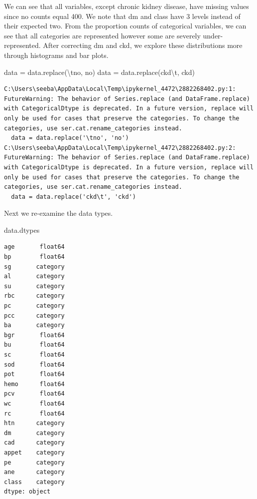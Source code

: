 \documentclass[
  11pt,
  letterpaper,
  DIV=11,
  numbers=noendperiod]{scrartcl}
\newenvironment{Shaded}{\begin{snugshade}}{\end{snugshade}}
\newcommand{\CharTok}[1]{\textcolor[rgb]{0.13,0.47,0.30}{#1}}
\newcommand{\NormalTok}[1]{\textcolor[rgb]{0.00,0.23,0.31}{#1}}
\newcommand{\OperatorTok}[1]{\textcolor[rgb]{0.37,0.37,0.37}{#1}}
\newcommand{\StringTok}[1]{\textcolor[rgb]{0.13,0.47,0.30}{#1}}
\begin{document}
We can see that all variables, except chronic kidney disease, have
missing values since no counts equal 400. We note that dm and class have
3 levels instead of their expected two. From the proportion counts of
categorical variables, we can see that all categories are represented
however some are severely under-represented. After correcting dm and
ckd, we explore these distributions more through histograms and bar
plots.

\begin{Shaded}
\begin{Highlighting}[]
\NormalTok{data }\OperatorTok{=}\NormalTok{ data.replace(}\StringTok{\textquotesingle{}}\CharTok{\textbackslash{}t}\StringTok{no\textquotesingle{}}\NormalTok{, }\StringTok{\textquotesingle{}no\textquotesingle{}}\NormalTok{)}
\NormalTok{data }\OperatorTok{=}\NormalTok{ data.replace(}\StringTok{\textquotesingle{}ckd}\CharTok{\textbackslash{}t}\StringTok{\textquotesingle{}}\NormalTok{, }\StringTok{\textquotesingle{}ckd\textquotesingle{}}\NormalTok{)}
\end{Highlighting}
\end{Shaded}

\begin{verbatim}
C:\Users\seeba\AppData\Local\Temp\ipykernel_4472\2882268402.py:1: FutureWarning: The behavior of Series.replace (and DataFrame.replace) with CategoricalDtype is deprecated. In a future version, replace will only be used for cases that preserve the categories. To change the categories, use ser.cat.rename_categories instead.
  data = data.replace('\tno', 'no')
C:\Users\seeba\AppData\Local\Temp\ipykernel_4472\2882268402.py:2: FutureWarning: The behavior of Series.replace (and DataFrame.replace) with CategoricalDtype is deprecated. In a future version, replace will only be used for cases that preserve the categories. To change the categories, use ser.cat.rename_categories instead.
  data = data.replace('ckd\t', 'ckd')
\end{verbatim}

Next we re-examine the data types.

\begin{Shaded}
\begin{Highlighting}[]
\NormalTok{data.dtypes}
\end{Highlighting}
\end{Shaded}

\begin{verbatim}
age       float64
bp        float64
sg       category
al       category
su       category
rbc      category
pc       category
pcc      category
ba       category
bgr       float64
bu        float64
sc        float64
sod       float64
pot       float64
hemo      float64
pcv       float64
wc        float64
rc        float64
htn      category
dm       category
cad      category
appet    category
pe       category
ane      category
class    category
dtype: object
\end{verbatim}
\end{document}
